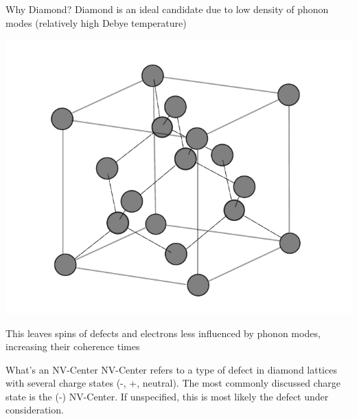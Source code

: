 \documentclass[11pt]{beamer}
\begin{document}
\begin{frame}{Why Diamond?}
Diamond is an ideal candidate due to low density of phonon modes (relatively high Debye temperature)

\begin{center}

\includegraphics[scale=0.47]{diamond_uc.pdf}

\end{center}

This leaves spins of defects and electrons less influenced by phonon modes, increasing their coherence times
\end{frame}

\begin{frame}{What's an NV-Center}
NV-Center refers to a type of defect in diamond lattices with several charge states (-, +, neutral). The most commonly discussed charge state is the (-) NV-Center. If unspecified, this is most likely the defect under consideration.


\vspace{5cm}

\end{frame}
\end{document}
